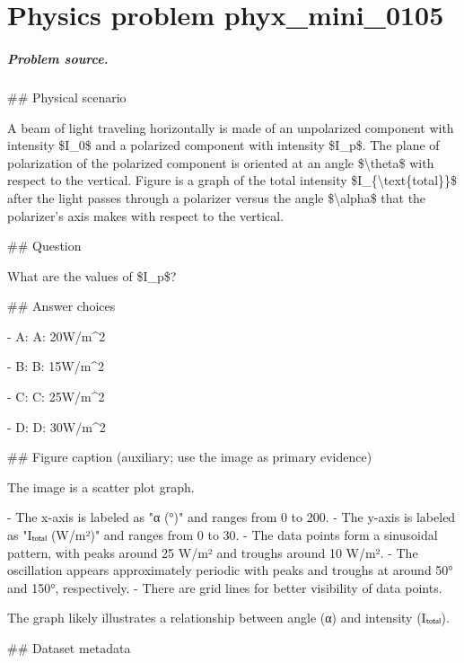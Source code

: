 
\chapter{Physics problem phyx\_mini\_0105}
\label{ch:PhyXMiniProblems_problem_phyx_mini_0105}

\paragraph{Problem source.}
\#\# Physical scenario

A beam of light traveling horizontally is made of an unpolarized component with intensity \$I\_0\$ and a polarized component with intensity \$I\_p\$. The plane of polarization of the polarized component is oriented at an angle \$\textbackslash{}theta\$ with respect to the vertical. Figure is a graph of the total intensity \$I\_\{\textbackslash{}text\{total\}\}\$ after the light passes through a polarizer versus the angle \$\textbackslash{}alpha\$ that the polarizer's axis makes with respect to the vertical.

\#\# Question

What are the values of \$I\_p\$?

\#\# Answer choices

- A: A: 20W/m\textasciicircum{}2

- B: B: 15W/m\textasciicircum{}2

- C: C: 25W/m\textasciicircum{}2

- D: D: 30W/m\textasciicircum{}2

\#\# Figure caption (auxiliary; use the image as primary evidence)

The image is a scatter plot graph.

- The x-axis is labeled as "α (°)" and ranges from 0 to 200.
- The y-axis is labeled as "Iₜₒₜₐₗ (W/m²)" and ranges from 0 to 30.
- The data points form a sinusoidal pattern, with peaks around 25 W/m² and troughs around 10 W/m².
- The oscillation appears approximately periodic with peaks and troughs at around 50° and 150°, respectively.
- There are grid lines for better visibility of data points.

The graph likely illustrates a relationship between angle (α) and intensity (Iₜₒₜₐₗ).

\#\# Dataset metadata

